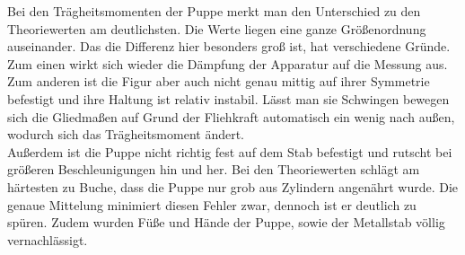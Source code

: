 Bei den Trägheitsmomenten der Puppe merkt man den Unterschied zu den Theoriewerten am deutlichsten. Die Werte liegen eine ganze Größenordnung auseinander. Das die Differenz hier besonders groß ist, hat verschiedene Gründe. Zum einen wirkt sich wieder die Dämpfung der Apparatur auf die Messung aus. Zum anderen ist die Figur aber auch nicht genau mittig auf ihrer Symmetrie befestigt und ihre Haltung ist relativ instabil. Lässt man sie Schwingen bewegen sich die Gliedmaßen auf Grund der Fliehkraft automatisch ein wenig nach außen, wodurch sich das Trägheitsmoment ändert.\\
Außerdem ist die Puppe nicht richtig fest auf dem Stab befestigt und rutscht bei größeren Beschleunigungen hin und her.
Bei den Theoriewerten schlägt am härtesten zu Buche, dass die Puppe nur grob aus Zylindern angenährt wurde. Die genaue Mittelung minimiert diesen Fehler zwar, dennoch ist er deutlich zu spüren. Zudem wurden Füße und Hände der Puppe, sowie der Metallstab völlig vernachlässigt.





